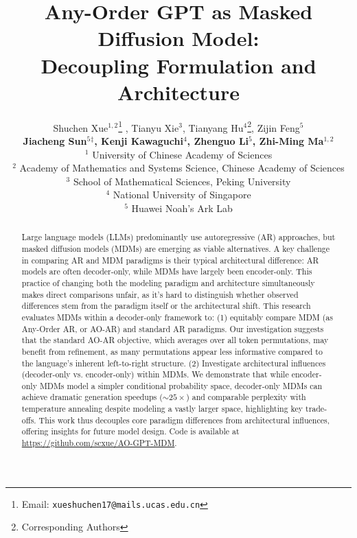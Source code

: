 \documentclass{article}
\title{Any-Order GPT as Masked Diffusion Model:\\Decoupling Formulation and Architecture}
\author{
Shuchen Xue$^{1,2}$\thanks{Email: \texttt{xueshuchen17@mails.ucas.edu.cn}}
, Tianyu Xie$^3$, Tianyang Hu$^4$\thanks{Corresponding Authors}, Zijin Feng$^5$\\
\textbf{Jiacheng Sun$^5$$^\ddagger$, Kenji Kawaguchi$^4$, Zhenguo Li$^5$, Zhi-Ming Ma$^{1,2}$}\\
$^{1}$ University of Chinese Academy of Sciences\\
$^{2}$ Academy of Mathematics and Systems Science, Chinese Academy of Sciences\\
$^{3}$ School of Mathematical Sciences, Peking University\\
$^{4}$ National University of Singapore\\
$^{5}$ Huawei Noah’s Ark Lab
}
\begin{document}
\maketitle


\begin{abstract}
Large language models (LLMs) predominantly use autoregressive (AR) approaches, but masked diffusion models (MDMs) are emerging as viable alternatives. A key challenge in comparing AR and MDM paradigms is their typical architectural difference: AR models are often decoder-only, while MDMs have largely been encoder-only. This practice of changing both the modeling paradigm and architecture simultaneously makes direct comparisons unfair, as it's hard to distinguish whether observed differences stem from the paradigm itself or the architectural shift. This research evaluates MDMs within a decoder-only framework to: (1) equitably compare MDM (as Any-Order AR, or AO-AR) and standard AR paradigms. Our investigation suggests that the standard AO-AR objective, which averages over all token permutations, may benefit from refinement, as many permutations appear less informative compared to the language's inherent left-to-right structure. (2) Investigate architectural influences (decoder-only vs. encoder-only) within MDMs. We demonstrate that while encoder-only MDMs model a simpler conditional probability space, decoder-only MDMs can achieve dramatic generation speedups ($\sim25\times$) and comparable perplexity with temperature annealing despite modeling a vastly larger space, highlighting key trade-offs. This work thus decouples core paradigm differences from architectural influences, offering insights for future model design. Code is available at \url{https://github.com/scxue/AO-GPT-MDM}.
\end{abstract}



























\end{document}
